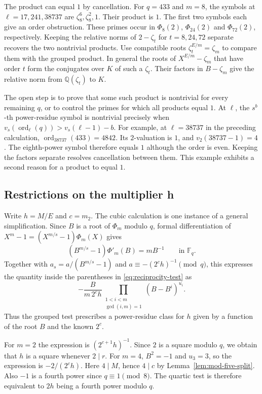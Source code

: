 \documentclass[11pt]{article}
\begin{document}
The product can equal $1$ by cancellation. For $q=433$ and $m=8$,
the symbols at $\ell=17,241,38737$ are $\zeta_8^6,\zeta_8^2,1$.
Their product is $1$. The first two symbols each give an order
obstruction. These primes occur in $\Phi_8(2)$, $\Phi_{24}(2)$
and $\Phi_{72}(2)$, respectively. Keeping the relative norms
of $2-\zeta_t$ for $t=8,24,72$ separate recovers the two nontrivial
products. Use compatible roots $\zeta_t^{E/m}=\zeta_m$ to compare
them with the grouped product. In general the roots of
$X^{E/m}-\zeta_m$ that have order $t$ form the conjugates over
$K$ of such a $\zeta_t$. Their factors in $B-\zeta_m$ give the
relative norm from $\mathbb Q(\zeta_t)$ to $K$.

The open step is to prove that some such product is nontrivial
for every remaining $q$, or to control the primes for which all
products equal $1$. At $\ell$, the $s^b$-th power-residue
symbol is nontrivial precisely when
$v_s(\operatorname{ord}_\ell(q))>v_s(\ell-1)-b$.
For example, at $\ell=38737$ in the preceding calculation,
$\operatorname{ord}_{38737}(433)=4842$. Its $2$-valuation is $1$,
and $v_2(38737-1)=4$. The eighth-power symbol therefore equals $1$
although the order is even. Keeping the factors separate resolves
cancellation between them. This example exhibits a second reason
for a product to equal $1$.

\subsection{Restrictions on the multiplier h}
\label{sec:reciprocity-h}

Write $h=M/E$ and $c=m_2$. The cubic calculation is one instance
of a general simplification. Since $B$ is a root of $\Phi_m$
modulo $q$, formal differentiation of
$X^m-1=(X^{m/s}-1)\Phi_m(X)$ gives
\[
(B^{m/s}-1)\Phi'_m(B)=mB^{-1}\qquad\text{in }\mathbb F_q.
\]
Together with $a_s=a/(B^{m/s}-1)$ and
$a\equiv-(2^ch)^{-1}\pmod q$, this expresses the quantity inside
the parentheses in \eqref{eq:reciprocity-test} as
\[
-\frac{B}{m\,2^c h}
\prod_{\substack{1<i<m\\\gcd(i,m)=1}}(B-B^i)^{u_i}.
\]
Thus the grouped test prescribes a power-residue class for $h$
given by a function of the root $B$ and the known $2^c$.

For $m=2$ the expression is $(2^{c+1}h)^{-1}$. Since $2$ is
a square modulo $q$, we obtain that $h$ is a square whenever
$2\mid r$. For $m=4$, $B^2=-1$ and $u_3=3$, so the expression is
$-2/(2^ch)$. Here $4\mid M$, hence $4\mid c$ by
Lemma~\ref{lem:mod-five-split}. Also $-1$ is a fourth power since
$q\equiv1\pmod8$. The quartic test is therefore equivalent to
$2h$ being a fourth power modulo $q$.
\end{document}
